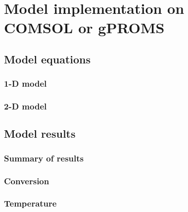 \section{Model implementation on COMSOL or gPROMS}
\subsection{Model equations}
\subsubsection{1-D model}
\subsubsection{2-D model}
\subsection{Model results}
\subsubsection{Summary of results}
\subsubsection{Conversion}
\subsubsection{Temperature}